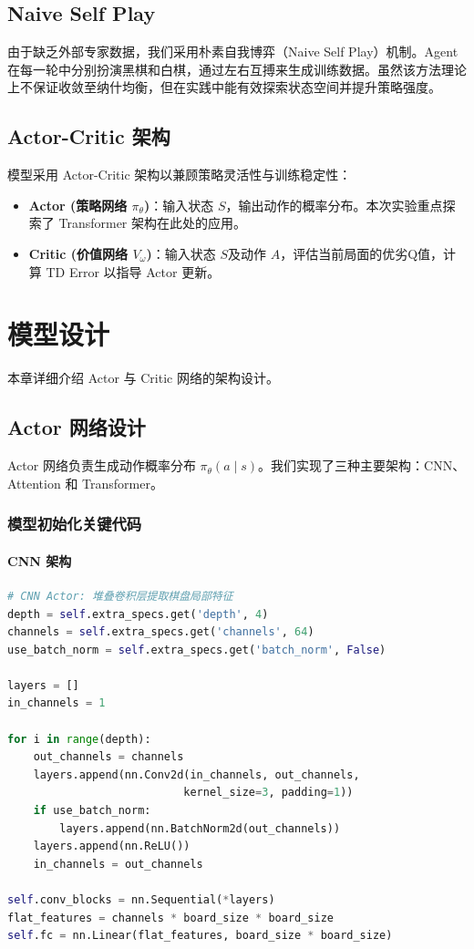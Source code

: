 \documentclass[oneside]{ctexbook}
\begin{document}
\section{Naive Self Play} \label{sec:naive_self_play}
由于缺乏外部专家数据，我们采用朴素自我博弈（Naive Self Play）机制。Agent 在每一轮中分别扮演黑棋和白棋，通过左右互搏来生成训练数据。虽然该方法理论上不保证收敛至纳什均衡，但在实践中能有效探索状态空间并提升策略强度。

\section{Actor-Critic 架构} \label{sec:actor_critic_architecture}
模型采用 Actor-Critic 架构以兼顾策略灵活性与训练稳定性：
\begin{itemize}
    \item \textbf{Actor (策略网络 $\pi_\theta$)}：输入状态 $S$，输出动作的概率分布。本次实验重点探索了 Transformer 架构在此处的应用。
    \item \textbf{Critic (价值网络 $V_\omega$)}：输入状态 $S$及动作 $A$，评估当前局面的优劣Q值，计算 TD Error 以指导 Actor 更新。
\end{itemize}

\chapter{模型设计} \label{chap:model}

本章详细介绍 Actor 与 Critic 网络的架构设计。

\section{Actor 网络设计}

Actor 网络负责生成动作概率分布 $\pi_\theta(a\mid s)$。我们实现了三种主要架构：CNN、Attention 和 Transformer。

\subsection{模型初始化关键代码}

\subsubsection{CNN 架构}

\begin{lstlisting}[language=Python]
# CNN Actor: 堆叠卷积层提取棋盘局部特征
depth = self.extra_specs.get('depth', 4)
channels = self.extra_specs.get('channels', 64)
use_batch_norm = self.extra_specs.get('batch_norm', False)

layers = []
in_channels = 1

for i in range(depth):
    out_channels = channels
    layers.append(nn.Conv2d(in_channels, out_channels, 
                           kernel_size=3, padding=1))
    if use_batch_norm:
        layers.append(nn.BatchNorm2d(out_channels))
    layers.append(nn.ReLU())
    in_channels = out_channels

self.conv_blocks = nn.Sequential(*layers)
flat_features = channels * board_size * board_size
self.fc = nn.Linear(flat_features, board_size * board_size)
\end{lstlisting}
\end{document}
